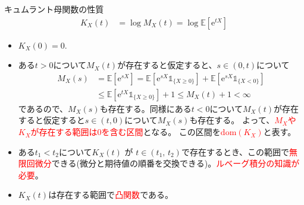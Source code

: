 \documentclass[lualatex,handout]{beamer}
\newcommand{\emm}[1]{\textcolor{red}{#1}}
\newcommand{\expt}[1]{\mathbb{E}\left[#1\right]}
\theoremstyle{definition}
\begin{document}
\begin{frame}{キュムラント母関数の性質}
\small
\begin{align*}
K_X(t) &= \log M_X(t) = \log \expt{\mathrm{e}^{tX}}
\end{align*}
\begin{itemize}
\setlength{\itemsep}{1em}
\item $K_X(0) = 0$.
\item ある$t>0$について$M_X(t)$が存在すると仮定すると、$s\in(0, t)$について
\begin{align*}
M_X(s) &= \expt{\mathrm{e}^{sX}}
= \expt{\mathrm{e}^{sX}\mathbb{1}_{\{X\ge 0\}}}+\expt{\mathrm{e}^{sX}\mathbb{1}_{\{X< 0\}}}\\
&\le \expt{\mathrm{e}^{tX}\mathbb{1}_{\{X\ge 0\}}}+1
\le M_X(t)+1<\infty
\end{align*}
であるので、$M_X(s)$も存在する。同様にある$t<0$について$M_X(t)$が存在すると仮定すると$s\in(t,0)$について$M_X(s)$も存在する。
よって、\emm{$M_X$や$K_X$が存在する範囲は0を含む区間}となる。
この区間を\emm{$\mathrm{dom}(K_X)$}と表す。
\item ある$t_1<t_2$について$K_X(t)$ が $t\in(t_1,\,t_2)$で存在するとき、この範囲で\emm{無限回微分}できる(微分と期待値の順番を交換できる)。\emm{ルベーグ積分の知識が必要}。
\item $K_X(t)$は存在する範囲で\emm{凸関数}である。
\end{itemize}
\end{frame}
\end{document}
